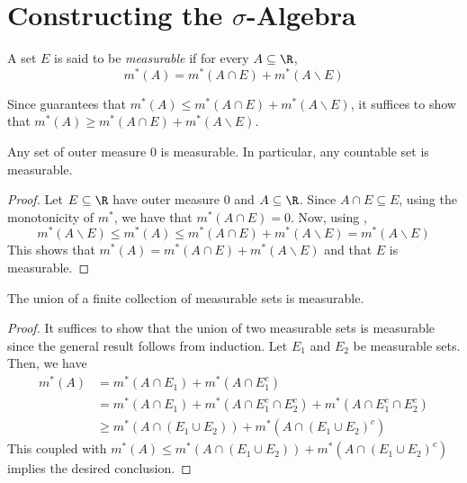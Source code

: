 \section{Constructing the \texorpdfstring{$\sigma$}{}-Algebra}

\begin{definition}
    A set $E$ is said to be \textit{measurable} if for every $A\subseteq\R$, 
    \begin{equation*}
        m^*(A) = m^*(A\cap E) + m^*(A\backslash E)
    \end{equation*}
\end{definition}

\begin{remark}
    Since  guarantees that $m^*(A)\le m^*(A\cap E) + m^*(A\backslash E)$, it suffices to show that $m^*(A)\ge m^*(A\cap E) + m^*(A\backslash E)$.
\end{remark}

\begin{proposition}
    Any set of outer measure $0$ is measurable. In particular, any countable set is measurable.
\end{proposition}
\begin{proof}
    Let $E\subseteq\R$ have outer measure $0$ and $A\subseteq\R$. Since $A\cap E\subseteq E$, using the monotonicity of $m^*$, we have that $m^*(A\cap E) = 0$. Now, using ,
    \begin{equation*}
        m^*(A\backslash E)\le m^*(A)\le m^*(A\cap E) + m^*(A\backslash E) = m^*(A\backslash E)
    \end{equation*}
    This shows that $m^*(A) = m^*(A\cap E) + m^*(A\backslash E)$ and that $E$ is measurable.
\end{proof}

\begin{proposition}
    The union of a finite collection of measurable sets is measurable.
\end{proposition}
\begin{proof}
    It suffices to show that the union of two measurable sets is measurable since the general result follows from induction. Let $E_1$ and $E_2$ be measurable sets. Then, we have 
    \begin{align*}
        m^*(A) &= m^*(A\cap E_1) + m^*(A\cap E_1^c)\\
        &= m^*(A\cap E_1) + m^*(A\cap E_1^c\cap E_2^c) + m^*(A\cap E_1^c\cap E_2^c)\\
        &\ge m^*(A\cap(E_1\cup E_2)) + m^*(A\cap (E_1\cup E_2)^c)
    \end{align*}
    This coupled with $m^*(A)\le m^*(A\cap(E_1\cup E_2)) + m^*(A\cap (E_1\cup E_2)^c)$ implies the desired conclusion.
\end{proof}

